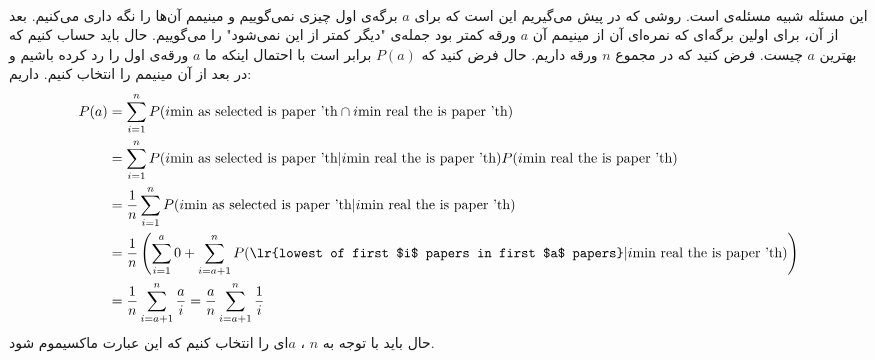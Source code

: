 \\
این مسئله شبیه مسئله‌ی
است. روشی که در پیش می‌گیریم این است که برای
$a$
برگه‌ی اول چیزی نمی‌گوییم و مینیمم آن‌ها را نگه داری می‌کنیم. بعد از آن، برای اولین برگه‌ای که نمره‌ای آن
از مینیمم آن
$a$
ورقه کمتر بود جمله‌ی
"دیگر کمتر از این نمی‌شود"
را می‌گوییم. حال باید حساب کنیم که بهترین
$a$
چیست. فرض کنید که در مجموع
$n$
ورقه داریم. حال فرض کنید که
$P(a)$
برابر است با احتمال اینکه ما
$a$
ورقه‌ی اول را رد کرده باشیم و در بعد از آن مینیمم را انتخاب کنیم. داریم:
\begin{align*}
    P(a) &= \sum_{i=1}^n P(i\text{min as selected is paper 'th} \cap i\text{min real the is paper 'th})\\
    &= \sum_{i=1}^n P(i\text{min as selected is paper 'th} | i\text{min real the is paper 'th}) P(i\text{min real the is paper 'th})\\
    &= \frac{1}{n} \sum_{i=1}^n P(i\text{min as selected is paper 'th} | i\text{min real the is paper 'th})\\
    &= \frac{1}{n} \left(\sum_{i=1}^{a} 0 + \sum_{i=a+1}^n P(\text{\lr{lowest of first $i$ papers in first $a$ papers}} | i\text{min real the is paper 'th})\right)\\
    &= \frac{1}{n} \sum_{i=a+1}^n \frac{a}{i} = \frac{a}{n} \sum_{i=a+1}^n \frac{1}{i}
\end{align*}
حال باید با توجه به
$n$
 ،
$a$ای را
انتخاب کنیم که این عبارت ماکسیموم شود.





